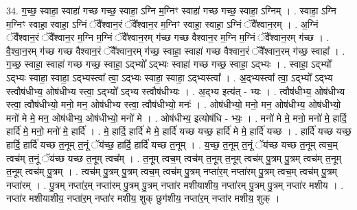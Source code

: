\documentclass[17pt]{extarticle}
\begin{document}
34. ग॒च्छ॒ स्वाहा॒ स्वाहा॑ गच्छ गच्छ॒ स्वाहा॒ ऽग्नि म॒ग्निꣳ स्वाहा॑ गच्छ गच्छ॒ स्वाहा॒ ऽग्निम् । . स्वाहा॒ ऽग्नि म॒ग्निꣳ स्वाहा॒ स्वाहा॒ ऽग्निं ॅवै᳚श्वान॒रं ॅवै᳚श्वान॒र म॒ग्निꣳ स्वाहा॒ स्वाहा॒ ऽग्निं ॅवै᳚श्वान॒रम् । . अ॒ग्निं ॅवै᳚श्वान॒रं ॅवै᳚श्वान॒र म॒ग्नि म॒ग्निं ॅवै᳚श्वान॒रम् ग॑च्छ गच्छ वैश्वान॒र म॒ग्नि म॒ग्निं ॅवै᳚श्वान॒रम् ग॑च्छ । . वै॒श्वा॒न॒रम् ग॑च्छ गच्छ वैश्वान॒रं ॅवै᳚श्वान॒रम् ग॑च्छ॒ स्वाहा॒ स्वाहा॑ गच्छ वैश्वान॒रं ॅवै᳚श्वान॒रम् ग॑च्छ॒ स्वाहा᳚ । . ग॒च्छ॒ स्वाहा॒ स्वाहा॑ गच्छ गच्छ॒ स्वाहा॒ ऽद्भ्यो᳚ ऽद्भ्यः स्वाहा॑ गच्छ गच्छ॒ स्वाहा॒ ऽद्भ्यः । . स्वाहा॒ ऽद्भ्यो᳚ ऽद्भ्यः स्वाहा॒ स्वाहा॒ ऽद्भ्यस्त्वा᳚ त्वा॒ ऽद्भ्यः स्वाहा॒ स्वाहा॒ ऽद्भ्यस्त्वा᳚ । . अ॒द्भ्यस्त्वा᳚ त्वा॒ ऽद्भ्यो᳚ ऽद्भ्य स्त्वौष॑धीभ्य॒ ओष॑धीभ्य स्त्वा॒ ऽद्भ्यो᳚ ऽद्भ्य स्त्वौष॑धीभ्यः । . अ॒द्भ्य इत्य॑त् - भ्यः । . त्वौष॑धीभ्य॒ ओष॑धीभ्य स्त्वा॒ त्वौष॑धीभ्यो॒ मनो॒ मन॒ ओष॑धीभ्य स्त्वा॒ त्वौष॑धीभ्यो॒ मनः॑ । . ओष॑धीभ्यो॒ मनो॒ मन॒ ओष॑धीभ्य॒ ओष॑धीभ्यो॒ मनो॑ मे मे॒ मन॒ ओष॑धीभ्य॒ ओष॑धीभ्यो॒ मनो॑ मे । . ओष॑धीभ्य॒ इत्योष॑धि - भ्यः॒ । . मनो॑ मे मे॒ मनो॒ मनो॑ मे॒ हार्दि॒ हार्दि॑ मे॒ मनो॒ मनो॑ मे॒ हार्दि॑ । . मे॒ हार्दि॒ हार्दि॑ मे मे॒ हार्दि॑ यच्छ यच्छ॒ हार्दि॑ मे मे॒ हार्दि॑ यच्छ । . हार्दि॑ यच्छ यच्छ॒ हार्दि॒ हार्दि॑ यच्छ त॒नूम् त॒नूं ॅय॑च्छ॒ हार्दि॒ हार्दि॑ यच्छ त॒नूम् । . य॒च्छ॒ त॒नूम् त॒नूं ॅय॑च्छ यच्छ त॒नूम् त्वच॒म् त्वच॑म् त॒नूं ॅय॑च्छ यच्छ त॒नूम् त्वच᳚म् । . त॒नूम् त्वच॒म् त्वच॑म् त॒नूम् त॒नूम् त्वच॑म् पु॒त्रम् पु॒त्रम् त्वच॑म् त॒नूम् त॒नूम् त्वच॑म् पु॒त्रम् । . त्वच॑म् पु॒त्रम् पु॒त्रम् त्वच॒म् त्वच॑म् पु॒त्रम् नप्ता॑र॒म् नप्ता॑रम् पु॒त्रम् त्वच॒म् त्वच॑म् पु॒त्रम् नप्ता॑रम् । . पु॒त्रम् नप्ता॑र॒म् नप्ता॑रम् पु॒त्रम् पु॒त्रम् नप्ता॑र मशीयाशीय॒ नप्ता॑रम् पु॒त्रम् पु॒त्रम् नप्ता॑र मशीय । . नप्ता॑र मशीयाशीय॒ नप्ता॑र॒म् नप्ता॑र मशीय॒ शुक् छुग॑शीय॒ नप्ता॑र॒म् नप्ता॑र मशीय॒ शुक् । \newline
\end{document}
